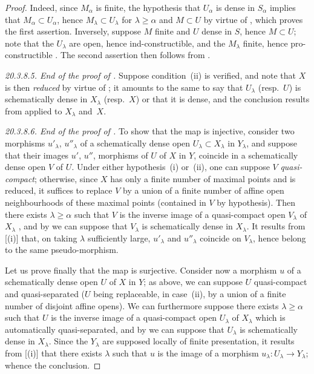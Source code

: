 \begin{proof}
Indeed, since $M_\alpha$ is finite, the hypothesis that $U_\alpha$ is dense in $S_\alpha$ implies that
$M_\alpha\subset U_\alpha$, hence $M_\lambda\subset U_\lambda$ for $\lambda\geq\alpha$ and $M\subset U$ by virtue of , which proves the first assertion.
Inversely, suppose $M$ finite and $U$ dense in $S$, hence $M\subset U$; note that the $U_\lambda$ are open, hence ind-constructible, and the $M_\lambda$ finite, hence pro-constructible .
The second assertion then follows from .

\label{IV.20.3.8.5}
\emph{20.3.8.5. End of the proof of .}
Suppose condition~(ii) is verified, and note that $X$ is then \emph{reduced} by virtue of ;
it amounts to the same to say that $U_\lambda$ (resp.\ $U$) is schematically dense in $X_\lambda$ (resp.\ $X$) or that it is dense, and the conclusion results from  applied to $X_\lambda$ and~$X$.

\label{IV.20.3.8.6}
\emph{20.3.8.6. End of the proof of .}
To show that the map  is injective, consider two morphisms $u'_\lambda$, $u''_\lambda$ of a schematically dense open $U_\lambda\subset X_\lambda$ in $Y_\lambda$, and suppose that their images $u'$, $u''$, morphisms of $U$ of $X$ in $Y$, coincide in a schematically dense open $V$ of $U$.
Under either hypothesis~(i) or~(ii), one can suppose $V$ \emph{quasi-compact};
otherwise, since $X$ has only a finite number of maximal points and is reduced, it suffices to replace $V$ by a union of a finite number of affine open neighbourhoods of these maximal points (contained in $V$ by hypothesis).
Then there exists $\lambda\geq\alpha$ such that $V$ is the inverse image of a quasi-compact open $V_\lambda$ of $X_\lambda$ , and by  we can suppose that $V_\lambda$ is schematically dense in $X_\lambda$.
It results from [(i)] that, on taking $\lambda$ sufficiently large, $u'_\lambda$ and $u''_\lambda$ coincide on $V_\lambda$, hence belong to the same pseudo-morphism.

Let us prove finally that the map  is surjective.
Consider now a morphism $u$ of a schematically dense open $U$ of $X$ in $Y$;
as above, we can suppose $U$ quasi-compact and quasi-separated ($U$ being replaceable, in case~(ii), by a union of a finite number of disjoint affine opens).
We can furthermore suppose there exists $\lambda\geq\alpha$ such that $U$ is the inverse image of a quasi-compact open $U_\lambda$ of $X_\lambda$  which is automatically quasi-separated, and by  we can suppose that $U_\lambda$ is schematically dense in $X_\lambda$.
Since the $Y_\lambda$ are supposed locally of finite presentation, it results from [(i)] that there exists $\lambda$ such that $u$ is the image of a morphism $u_\lambda:U_\lambda\to Y_\lambda$; whence the conclusion.


\end{proof}
